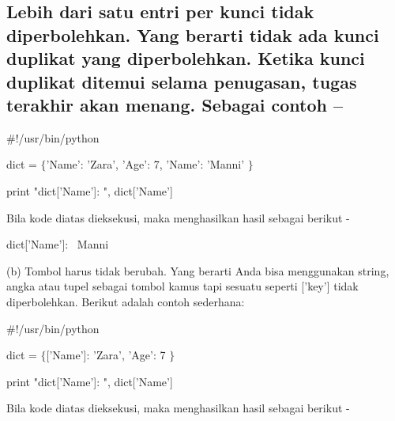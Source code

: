 \documentclass[a4paper,12pt]{report}
\begin{document}
\subsection*{Lebih dari satu entri per kunci tidak diperbolehkan. Yang berarti tidak ada kunci duplikat yang diperbolehkan. Ketika kunci duplikat ditemui selama penugasan, tugas terakhir akan menang. Sebagai contoh –}
 \par
\vspace{12pt}
\noindent 
 \hspace*{0.5in}  $  \#  $!/usr/bin/python \par
\vspace{12pt}
\noindent 
 \hspace*{0.5in} dict =  $  \{  $'Name': 'Zara', 'Age': 7, 'Name': 'Manni' $  \}  $ \par
\vspace{12pt}
\noindent 
 \hspace*{0.5in} print "dict['Name']: ", dict['Name'] \par
\begin{adjustwidth}{0.03in}{0.03in}
Bila kode diatas dieksekusi, maka menghasilkan hasil sebagai berikut -\end{adjustwidth}
 \par
\noindent 
{\fontsize{9pt}{9pt}\selectfont  \hspace*{0.5in} dict['Name']:~ Manni} \par
\vspace{12pt}
\begin{adjustwidth}{0.03in}{0.03in}
(b) Tombol harus tidak berubah. Yang berarti Anda bisa menggunakan string, angka atau tupel sebagai tombol kamus tapi sesuatu seperti ['key'] tidak diperbolehkan. Berikut adalah contoh sederhana:\end{adjustwidth}
 \par
\vspace{12pt}
\noindent 
 \hspace*{0.5in}  $  \#  $!/usr/bin/python \par
\vspace{12pt}
\noindent 
 \hspace*{0.5in} dict =  $  \{  $['Name']: 'Zara', 'Age': 7 $  \}  $ \par
\vspace{12pt}
\noindent 
 \hspace*{0.5in} print "dict['Name']: ", dict['Name'] \par
\begin{adjustwidth}{0.03in}{0.03in}
Bila kode diatas dieksekusi, maka menghasilkan hasil sebagai berikut -\end{adjustwidth}
\end{document}
